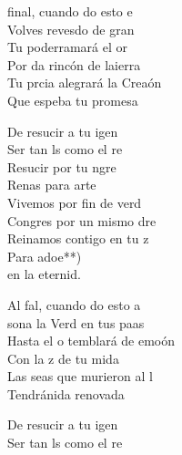 \begin{cancion}%
	 final, cuando do esto e  \\
	Volves revesdo de gran  \\
	Tu poderramará el or\\
	Por da rincón de laierra\\
	Tu prcia alegrará la Creaón\\
	Que espeba tu promesa\jump\\
	\begin{chorus}%
		De resucir a tu igen\\
		Ser tan ls como el re\\
		Resucir por tu ngre\\
		Renas para arte\\
		Vivemos por fin de verd\\
		Congres por un mismo dre\\
		Reinamos contigo en tu z\\
		Para adoe**)\\
		en la eternid.\jump\\
	\end{chorus}%
	Al fal, cuando do esto a   \\
	sona la Verd en tus paas\\
	Hasta el o temblará de emoón\\
	Con la z de tu mida\\
	Las seas que murieron al l\\
	Tendránida renovada\jump\\
	\begin{chorus}%
		De resucir a tu igen\\
		Ser tan ls como el \chord{Re}{}{ai}re\\

\end{chorus}
\end{cancion}
